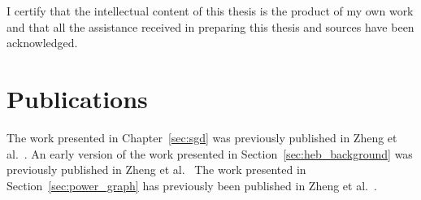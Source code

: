 I certify that the intellectual content of this thesis is the product of my own work and that all the assistance received in preparing this thesis and sources have been acknowledged.

\section{Publications}

The work presented in Chapter~\ref{sec:sgd} was previously published in Zheng et al.\ \cite{Zheng2019Stochastic}.
An early version of the work presented in Section~\ref{sec:heb_background} was previously published in Zheng et al.\ \cite{Zheng2018}
The work presented in Section~\ref{sec:power_graph} has previously been published in Zheng et al.\ \cite{Zheng2019Power}.